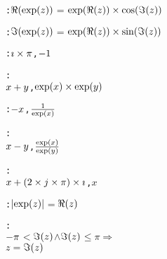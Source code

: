 \begin{alltt}
  :  \(\Reonefn{\pvsid{exp}\pvsid{(}z\pvsid{)}}\) \(=\) \(\optimestwofn{\pvsid{exp}\pvsid{(}\Reonefn{z}\pvsid{)}}{\pvsid{cos}\pvsid{(}\Imonefn{z}\pvsid{)}}\)\vspace*{\pvsdeclspacing}

  :  \(\Imonefn{\pvsid{exp}\pvsid{(}z\pvsid{)}}\) \(=\) \(\optimestwofn{\pvsid{exp}\pvsid{(}\Reonefn{z}\pvsid{)}}{\pvsid{sin}\pvsid{(}\Imonefn{z}\pvsid{)}}\)\vspace*{\pvsdeclspacing}

   


   


  :  \pvsid{(}\pvsid{(}\(\optimestwofn{{\imath}}{\pi}\)\pvsid{)}, \(\opdifferenceonefn{1}\)\pvsid{)}\vspace*{\pvsdeclspacing}

  : 
    \pvsid{(}\pvsid{(}\(\opplustwofn{x}{y}\)\pvsid{)}, \(\optimestwofn{\pvsid{exp}\pvsid{(}x\pvsid{)}}{\pvsid{exp}\pvsid{(}y\pvsid{)}}\)\pvsid{)}\vspace*{\pvsdeclspacing}

  :  \pvsid{(}\pvsid{(}\(\opdifferenceonefn{x}\)\pvsid{)}, \(\opdividetwofn{1}{\pvsid{exp}\pvsid{(}x\pvsid{)}}\)\pvsid{)}\vspace*{\pvsdeclspacing}

  : 
    \pvsid{(}\pvsid{(}\(\opdifferencetwofn{x}{y}\)\pvsid{)}, \(\opdividetwofn{\pvsid{exp}\pvsid{(}x\pvsid{)}}{\pvsid{exp}\pvsid{(}y\pvsid{)}}\)\pvsid{)}\vspace*{\pvsdeclspacing}

  : 
    \pvsid{(}\pvsid{(}\(\opplustwofn{x}{\optimestwofn{\pvsid{(}\optimestwofn{\optimestwofn{2}{j}}{\pi}\pvsid{)}}{{\imath}}}\)\pvsid{)}, \pvsid{(}\(x\)\pvsid{)}\pvsid{)}\vspace*{\pvsdeclspacing}

  :  \(\absonefn{\pvsid{exp}\pvsid{(}z\pvsid{)}}\) \(=\) \pvsid{(}\(\Reonefn{z}\)\pvsid{)}\vspace*{\pvsdeclspacing}

  : 
    \(\opdifferenceonefn{\pi}\) \(<\) \(\Imonefn{z}\) \(\wedge\) \(\Imonefn{z}\) \(\leq\) \(\pi\) \(\Rightarrow\)
     \pvsid{(}\pvsid{(}\(z\)\pvsid{)}\pvsid{)} \(=\) \(\Imonefn{z}\)\vspace*{\pvsdeclspacing}


\end{alltt}
